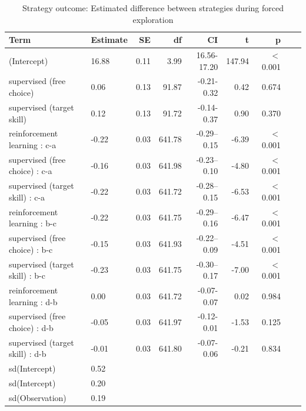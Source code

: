 \documentclass[pdflatex,sn-nature]{sn-jnl}%
\theoremstyle{thmstyleone}%
\theoremstyle{thmstyletwo}%
\theoremstyle{thmstylethree}%
\begin{document}
\begin{appendices}
\begin{table}[p]
\caption{Strategy outcome: Estimated difference between strategies during forced exploration}
\label{table_strategyoutcome_diffstrategy}
\centering
\begin{tabular}{llrrrrrrl}
  \hline
Term & Estimate & SE & df & CI & t & p \\ 
  \hline
(Intercept) & 16.88 & 0.11 & 3.99 & 16.56-17.20 & 147.94 &  $<$  0.001 \\ 
 supervised (free choice)  & 0.06 & 0.13 & 91.87 & -0.21-0.32 & 0.42 &    0.674 \\ 
  supervised (target skill) & 0.12 & 0.13 & 91.72 & -0.14-0.37 & 0.90 &    0.370 \\ 
  reinforcement learning  : c-a & -0.22 & 0.03 & 641.78 & -0.29--0.15 & -6.39 &  $<$  0.001 \\ 
  supervised (free choice) : c-a & -0.16 & 0.03 & 641.98 & -0.23--0.10 & -4.80 &  $<$  0.001 \\ 
  supervised (target skill) : c-a & -0.22 & 0.03 & 641.72 & -0.28--0.15 & -6.53 &  $<$  0.001 \\ 
  reinforcement learning : b-c & -0.22 & 0.03 & 641.75 & -0.29--0.16 & -6.47 &  $<$  0.001 \\ 
  supervised (free choice) : b-c & -0.15 & 0.03 & 641.93 & -0.22--0.09 & -4.51 &  $<$  0.001 \\ 
  supervised (target skill) : b-c & -0.23 & 0.03 & 641.75 & -0.30--0.17 & -7.00 &  $<$  0.001 \\ 
  reinforcement learning : d-b & 0.00 & 0.03 & 641.72 & -0.07-0.07 & 0.02 &    0.984 \\ 
  supervised (free choice) : d-b & -0.05 & 0.03 & 641.97 & -0.12-0.01 & -1.53 &    0.125 \\ 
  supervised (target skill) : d-b & -0.01 & 0.03 & 641.80 & -0.07-0.06 & -0.21 &    0.834 \\ 
  sd(Intercept) & 0.52 &  &  &  &  &    \\ 
  sd(Intercept) & 0.20 &  &  &  &  &    \\ 
  sd(Observation) & 0.19 &  &  &  &  &    \\ 
   \hline
\end{tabular}
\end{table}



\end{appendices}
\end{document}
